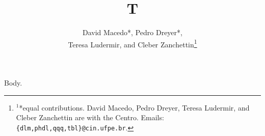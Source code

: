 \documentclass[journal]{IEEEtran}
\begin{document}
\title{T}
\author{David Macedo*, Pedro Dreyer*,\\Teresa Ludermir, and Cleber Zanchettin\thanks{$^{1}$*equal contributions. David Macedo, Pedro Dreyer, Teresa Ludermir, and Cleber Zanchettin are with the Centro. Emails: {\tt\small \{dlm,phdl,qqq,tbl\}@cin.ufpe.br}.}}
\maketitle
Body.
\end{document}

